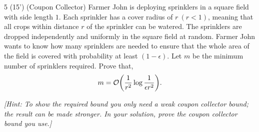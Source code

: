     \begin{question}{5 (15') (Coupon Collector)}
    Farmer John is deploying sprinklers in a square field with side length $1$. Each sprinkler has a cover radius of $r\ (r < 1)$, meaning that all crops within distance $r$ of the sprinkler can be watered. The sprinklers are dropped independently and uniformly in the square field at random. Farmer John wants to know how many sprinklers are needed to ensure that the whole area of the field is covered with probability at least $(1 - \epsilon)$. Let $m$ be the minimum number of sprinklers required. Prove that,
    \[ m = \order{\frac{1}{r^2} \log{\frac{1}{\epsilon r^2}}}. \]

    \textit{[Hint: To show the required bound you only need a weak coupon collector bound; the result can be made stronger. In your solution, prove the coupon collector bound you use.]}
    \end{question}